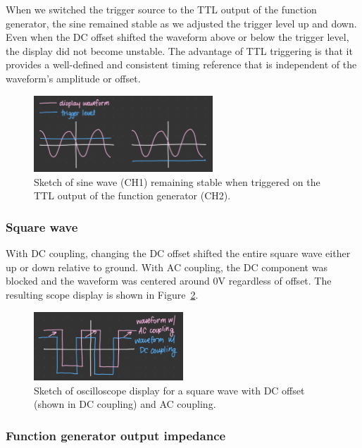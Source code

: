 \documentclass{article}
\begin{document}
\noindent When we switched the trigger source to the TTL output of the function
generator, the sine remained stable as we adjusted the trigger level up and
down. Even when the DC offset shifted the waveform above or below the trigger
level, the display did not become unstable. The advantage of TTL triggering is
that it provides a well-defined and consistent timing reference that is
independent of the waveform's amplitude or offset.

\begin{figure}[H]
    \centering
    \includegraphics[width=0.60\textwidth]{1.4.bb.png}
    \caption{Sketch of sine wave (CH1) remaining stable when triggered on the TTL output of the function generator (CH2).}
    \label{fig:ttl_output}
\end{figure}

\subsubsection{Square wave}

With DC coupling, changing the DC offset shifted the entire square wave either
up or down relative to ground. With AC coupling, the DC component was blocked 
and the waveform was centered around $0\si{\volt}$ regardless of offset. The
resulting scope display is shown in Figure~\ref{fig:dc_coupling}.

\begin{figure}[H]
    \centering
    \includegraphics[width=0.5\textwidth]{1.4.ca.png}
    \caption{Sketch of oscilloscope display for a square wave with DC offset (shown in DC coupling) and AC coupling.}
    \label{fig:dc_coupling}
\end{figure}

\subsubsection{Function generator output impedance}
\end{document}
